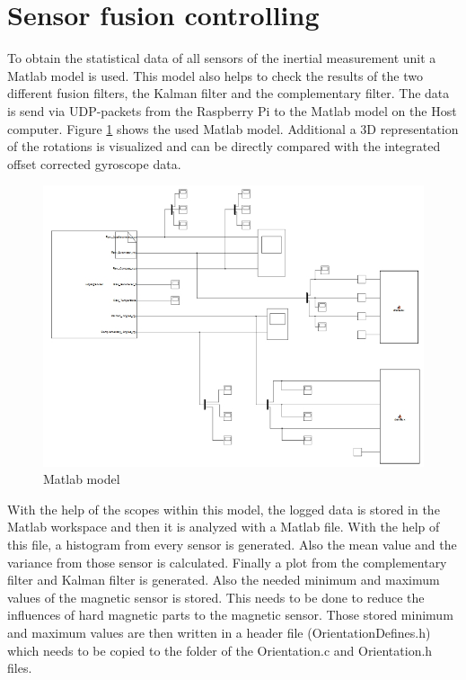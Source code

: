 \newpage
\section{Sensor fusion controlling}
\label{sec:SensFusContr}

To obtain the statistical data of all sensors of the inertial measurement unit a Matlab model is used. This model also helps to check the results of the two different fusion filters, the Kalman filter and the complementary filter. The data is send via UDP-packets from the Raspberry Pi to the Matlab model on the Host computer. Figure \ref{fig:model} shows the used Matlab model. Additional a 3D representation of the rotations is visualized and can be directly compared with the integrated offset corrected gyroscope data.

\begin{figure}[H]
	\centering\includegraphics[width=1\textwidth]{fig/Res_Kal_Comp/Model}
	\caption{Matlab model}
	\label{fig:model}
\end{figure}

\newpage
With the help of the scopes within this model, the logged data is stored in the Matlab workspace and then it is analyzed with a Matlab file. With the help of this file, a histogram from every sensor is generated. Also the mean value and the variance from those sensor is calculated. Finally a plot from the complementary filter and Kalman filter is generated. Also the needed minimum and maximum values of the magnetic sensor is stored. This needs to be done to reduce the influences of hard magnetic parts to the magnetic sensor. Those stored minimum and maximum values are then written in a header file (OrientationDefines.h) which needs to be copied to the folder of the Orientation.c and Orientation.h files.
